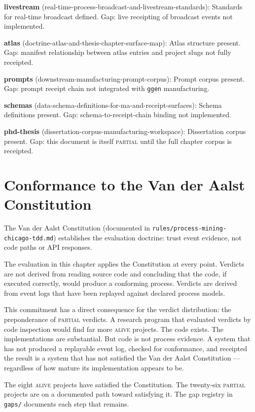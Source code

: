 \textbf{livestream} (real-time-process-broadcast-and-livestream-standards): Standards for real-time broadcast defined. Gap: live receipting of broadcast events not implemented.

\textbf{atlas} (doctrine-atlas-and-thesis-chapter-surface-map): Atlas structure present. Gap: manifest relationship between atlas entries and project slugs not fully receipted.

\textbf{prompts} (downstream-manufacturing-prompt-corpus): Prompt corpus present. Gap: prompt receipt chain not integrated with \texttt{ggen} manufacturing.

\textbf{schemas} (data-schema-definitions-for-ma-and-receipt-surfaces): Schema definitions present. Gap: schema-to-receipt-chain binding not implemented.

\textbf{phd-thesis} (dissertation-corpus-manufacturing-workspace): Dissertation corpus present. Gap: this document is itself \textsc{partial} until the full chapter corpus is receipted.

\section{Conformance to the Van der Aalst Constitution}

The Van der Aalst Constitution (documented in \texttt{rules/process-mining-chicago-tdd.md}) establishes the evaluation doctrine: trust event evidence, not code paths or API responses.

The evaluation in this chapter applies the Constitution at every point. Verdicts are not derived from reading source code and concluding that the code, if executed correctly, would produce a conforming process. Verdicts are derived from event logs that have been replayed against declared process models.

This commitment has a direct consequence for the verdict distribution: the preponderance of \textsc{partial} verdicts. A research program that evaluated verdicts by code inspection would find far more \textsc{alive} projects. The code exists. The implementations are substantial. But code is not process evidence. A system that has not produced a replayable event log, checked for conformance, and receipted the result is a system that has not satisfied the Van der Aalst Constitution --- regardless of how mature its implementation appears to be.

The eight \textsc{alive} projects have satisfied the Constitution. The twenty-six \textsc{partial} projects are on a documented path toward satisfying it. The gap registry in \texttt{gaps/} documents each step that remains.

